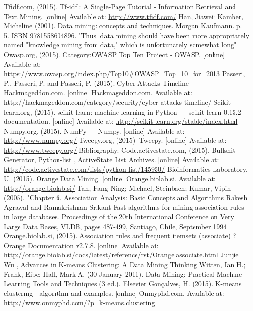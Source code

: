 \documentclass[12pt]{article}
\begin{document}
\begin{thebibliography}{99}
Tfidf.com, (2015). Tf-idf : A Single-Page Tutorial - Information Retrieval and Text Mining. [online] Available at: \url{http://www.tfidf.com/} 
Han, Jiawei; Kamber, Micheline (2001). Data mining: concepts and techniques. Morgan Kaufmann. p. 5. ISBN 9781558604896. "Thus, data mining should have been more appropriately named "knowledge mining from data," which is unfortunately somewhat long"
Owasp.org, (2015). Category:OWASP Top Ten Project - OWASP. [online] Available at: \url{https://www.owasp.org/index.php/Top10#OWASP_Top_10_for_2013} 
Passeri, P., Passeri, P. and Passeri, P. (2015). Cyber Attacks Timeline | Hackmageddon.com. [online] Hackmageddon.com. Available at: http://hackmageddon.com/category/security/cyber-attacks-timeline/ 
Scikit-learn.org, (2015). scikit-learn: machine learning in Python — scikit-learn 0.15.2 documentation. [online] Available at: \url{http://scikit-learn.org/stable/index.html}
 Numpy.org, (2015). NumPy — Numpy. [online] Available at: \url{http://www.numpy.org/}
Tweepy.org, (2015). Tweepy. [online] Available at: \url{http://www.tweepy.org/} 
Bibliography: Code.activestate.com, (2015). Bullshit Generator, Python-list , ActiveState List Archives. [online] Available at: \url{http://code.activestate.com/lists/python-list/145950/}
Bioinformatics Laboratory, U. (2015). Orange Data Mining. [online] Orange.biolab.si. Available at: \url{http://orange.biolab.si/} 
Tan, Pang-Ning; Michael, Steinbach; Kumar, Vipin (2005). "Chapter 6. Association Analysis: Basic Concepts and Algorithms
Rakesh Agrawal and Ramakrishnan Srikant Fast algorithms for mining association rules in large databases. Proceedings of the 20th International Conference on Very Large Data Bases, VLDB, pages 487-499, Santiago, Chile, September 1994
Orange.biolab.si, (2015). Association rules and frequent itemsets (associate) ? Orange Documentation v2.7.8. [online] Available at: http://orange.biolab.si/docs/latest/reference/rst/Orange.associate.html
Junjie Wu , Advances in K-means Clustering: A Data Mining Thinking
Witten, Ian H.; Frank, Eibe; Hall, Mark A. (30 January 2011). Data Mining: Practical Machine Learning Tools and Techniques (3 ed.). Elsevier
Gonçalves, H. (2015). K-means clustering - algorithm and examples. [online] Onmyphd.com. Available at: \url{http://www.onmyphd.com/?p=k-means.clustering}

\end{thebibliography}
\end{document}
